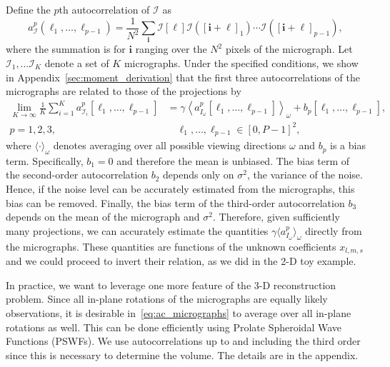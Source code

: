 \documentclass[english,11pt]{article}
\newcommand{\1}{\mathbf{1}}
\newcommand{\II}{\mathcal{I}}
\newcommand{\mb}{\mathbf}
\newcommand*\Bell{\ensuremath{\boldsymbol\ell}}
\newcommand{\TODO}[1]{{\color{red}{[#1]}}}
\numberwithin{equation}{section}
\theoremstyle{plain}
\theoremstyle{definition}
\theoremstyle{remark}
\theoremstyle{plain}
\theoremstyle{remark}
\theoremstyle{plain}
\theoremstyle{plain}
\newcommand{\tamir}{x}
\begin{document}
Define the $p$th autocorrelation of $\II$ as
\begin{equation*} \label{eq:Kth_autocorrelation}
a^p_\II(\Bell_1,\ldots, \Bell_{p-1}) = \frac{1}{N^2}\sum_{\mb i}\II[\Bell]\II([\mb i+\Bell]_1)\cdots \II([\mb i+\Bell]_{p-1}),
\end{equation*}
where the summation is for $\mb i $ ranging over the $N^2$  pixels of the micrograph. %
Let $\II_1,\ldots\II_K$ denote a set of $K$ micrographs. 
Under the specified conditions, we show in Appendix~\ref{sec:moment_derivation} that the first three autocorrelations  of the micrographs are related to those of the projections by \begin{align} \label{eq:ac_micrographs}
\lim_{K\to\infty}\frac{1}{K}\sum_{i=1}^Ka^p_{\II_i}[\Bell_1,\ldots,\Bell_{p-1}]  &= \gamma\left\langle a^p_{I_\omega}[\Bell_1,\ldots,\Bell_{p-1}]\right\rangle_{\omega} + b_p[\Bell_1,\ldots,\Bell_{p-1}], \\ p=1,2,3,& \quad \Bell_1,\ldots,\Bell_{p-1}\in[0,P-1]^2, \nonumber
\end{align}
where $\langle\cdot\rangle_\omega$ denotes averaging over all possible viewing directions $\omega$ and $b_p$ is a bias term. %
Specifically,  $b_1 = 0$ and therefore the mean is unbiased. The bias term of the second-order autocorrelation  $b_2$ depends only on $\sigma^2$, the variance of the noise. Hence, if the noise level can be accurately estimated from the micrographs, this bias can be removed. 
Finally, the bias term of the third-order autocorrelation $b_3$ depends on the mean of the micrograph and $\sigma^2$.  Therefore, given sufficiently many projections, we can accurately estimate the quantities $\gamma\langle a^p_{I_{\omega}}\rangle_{\omega}$ directly from the micrographs. These quantities are functions of the unknown coefficients $\tamir_{l,m,s}$ and we could proceed to invert their relation, as we did in the 2-D toy example. 

In practice, we want to leverage one more feature of the 3-D reconstruction problem.
Since all in-plane rotations of the micrographs are equally likely observations, 
it is desirable in~\eqref{eq:ac_micrographs} to average over all in-plane rotations as well.
This can be done efficiently using Prolate Spheroidal Wave Functions (PSWFs).  We use autocorrelations up to and including the  third order since this is necessary to  determine the volume.
The details are in the appendix. 
\end{document}
